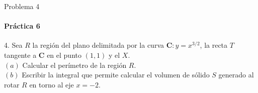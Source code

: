 \documentclass{plantillaPPT}
\begin{document}
\begin{frame}{Problema 4}
\framesubtitle{Práctica 6}

4. Sea \(R\) la región del plano delimitada por la curva \(\mathbf{C}: y=x^{3/2}\), la recta \(T\) tangente a \(\mathbf{C}\) en el punto \((1,1)\) y el \(X\).\\[15pt]
\((a)\) Calcular el perímetro de la región \(R\).\\[5pt]
\((b)\) Escribir la integral que permite calcular el volumen de sólido \(S\) generado al rotar \(R\) en torno al eje \(x=-2\).

    
\end{frame}
\end{document}
